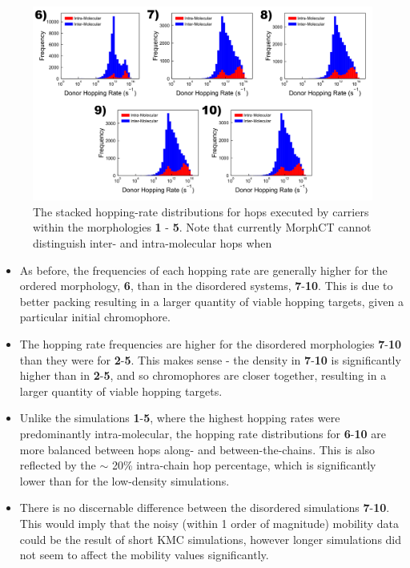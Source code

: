 \documentclass[12pt]{article}
\begin{document}
\begin{figure}[h!]\centering
	\includegraphics[width=\textwidth]{Figures/ShrunkDonorHoppingRateMixed.pdf}
    \caption{The stacked hopping-rate distributions for hops executed by carriers within the morphologies \textbf{1} - \textbf{5}.
    Note that currently MorphCT cannot distinguish inter- and intra-molecular hops when }
	\label{fig:HoppingRateMixed}
\end{figure}

\begin{itemize}
    \item{As before, the frequencies of each hopping rate are generally higher for the ordered morphology, \textbf{6}, than in the disordered systems, \textbf{7}-\textbf{10}.
        This is due to better packing resulting in a larger quantity of viable hopping targets, given a particular initial chromophore.}
    \item{The hopping rate frequencies are higher for the disordered morphologies \textbf{7}-\textbf{10} than they were for \textbf{2}-\textbf{5}.
        This makes sense - the density in \textbf{7}-\textbf{10} is significantly higher than in \textbf{2}-\textbf{5}, and so chromophores are closer together, resulting in a larger quantity of viable hopping targets.}
    \item{Unlike the simulations \textbf{1}-\textbf{5}, where the highest hopping rates were predominantly intra-molecular, the hopping rate distributions for \textbf{6}-\textbf{10} are more balanced between hops along- and between-the-chains.
        This is also reflected by the $\sim$ 20\% intra-chain hop percentage, which is significantly lower than for the low-density simulations.}
    \item{There is no discernable difference between the disordered simulations \textbf{7}-\textbf{10}. This would imply that the noisy (within 1 order of magnitude) mobility data could be the result of short KMC simulations, however longer simulations did not seem to affect the mobility values significantly.}
\end{itemize}
\end{document}
